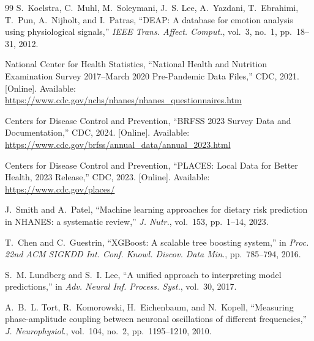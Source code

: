 \documentclass[journal]{IEEEtran}
\begin{document}
\begin{thebibliography}{99}
S.~Koelstra, C.~Muhl, M.~Soleymani, J.~S. Lee, A.~Yazdani, T.~Ebrahimi,
T.~Pun, A.~Nijholt, and I.~Patras, ``DEAP: A database for emotion analysis
using physiological signals,'' \textit{IEEE Trans. Affect. Comput.},
vol.~3, no.~1, pp.~18--31, 2012.

National Center for Health Statistics, ``National Health and Nutrition Examination
Survey 2017--March 2020 Pre-Pandemic Data Files,'' CDC, 2021.
[Online]. Available: \url{https://www.cdc.gov/nchs/nhanes/nhanes_questionnaires.htm}

Centers for Disease Control and Prevention, ``BRFSS 2023 Survey Data and
Documentation,'' CDC, 2024.
[Online]. Available: \url{https://www.cdc.gov/brfss/annual_data/annual_2023.html}

Centers for Disease Control and Prevention, ``PLACES: Local Data for Better
Health, 2023 Release,'' CDC, 2023.
[Online]. Available: \url{https://www.cdc.gov/places/}

J.~Smith and A.~Patel, ``Machine learning approaches for dietary risk prediction
in NHANES: a systematic review,'' \textit{J. Nutr.}, vol.~153, pp.~1--14, 2023.

T.~Chen and C.~Guestrin, ``XGBoost: A scalable tree boosting system,''
in \textit{Proc. 22nd ACM SIGKDD Int. Conf. Knowl. Discov. Data Min.},
pp.~785--794, 2016.

S.~M. Lundberg and S.~I. Lee, ``A unified approach to interpreting model
predictions,'' in \textit{Adv. Neural Inf. Process. Syst.}, vol.~30, 2017.

A.~B.~L. Tort, R.~Komorowski, H.~Eichenbaum, and N.~Kopell,
``Measuring phase-amplitude coupling between neuronal oscillations of different
frequencies,'' \textit{J. Neurophysiol.}, vol.~104, no.~2, pp.~1195--1210, 2010.

\end{thebibliography}
\end{document}
